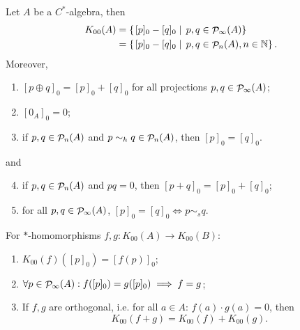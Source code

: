 \begin{proposition} \label{prop:StandardPictureK00}
Let $A$ be a $C^*$-algebra, then
\begin{align*}
K_{00}(A) &= \left\{\left. [p]_0 - [q]_0 \;\right|\; p,q \in \mathop{\mathcal{P}}\nolimits_\infty(A) \right\} \\
&= \left\{\left. [p]_0 - [q]_0 \;\right|\; p,q \in \mathop{\mathcal{P}}\nolimits_n(A), n\in \mathbb{N} \right\}.
\end{align*}
Moreover,
\begin{enumerate}
\item $[p\oplus q]_0 = [p]_0+[q]_0$ for all projections $p,q\in\mathop{\mathcal{P}}\nolimits_\infty(A)$;
\item $[0_A]_0 = 0$;
\item if $p,q\in\mathop{\mathcal{P}}\nolimits_n(A)$ and $p\sim_h q \in \mathop{\mathcal{P}}\nolimits_n(A)$, then $[p]_0 = [q]_0$.
\end{enumerate}
and
\begin{enumerate}
\setcounter{enumi}{3}
\item if $p,q\in\mathop{\mathcal{P}}\nolimits_n(A)$ and $pq =0$, then $[p+q]_0 = [p]_0+[q]_0$;
\item for all $p,q\in\mathop{\mathcal{P}}\nolimits_\infty(A)$, $[p]_0 = [q]_0 \iff p\sim_s q$.
\end{enumerate}
For $*$-homomorphisms $f,g: K_{00}(A)\to K_{00}(B)$:
\begin{enumerate}
\item $K_{00}(f)([p]_0) = [f(p)]_0$;
\item $\forall p\in\mathop{\mathcal{P}}\nolimits_\infty(A): f([p]_0) = g([p]_0) \implies  f = g$;
\item If $f,g$ are orthogonal, i.e. for all $a\in A$: $f(a)\cdot g(a) = 0$, then
\[ K_{00}(f+g) = K_{00}(f)+K_{00}(g). \]
\end{enumerate}
\end{proposition}
